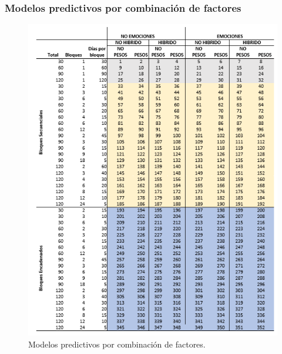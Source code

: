 \documentclass{beamer}
\begin{document}
\begin{frame}
	\frametitle{Modelos predictivos por combinación de factores}
	
	\begin{figure}[H]
		\centering
		\includegraphics[width=0.5\linewidth]{figs/imagen32}
		\caption{Modelos predictivos por combinación de factores.}
		\label{fig:imagen32}
	\end{figure}
\end{frame}
\end{document}
